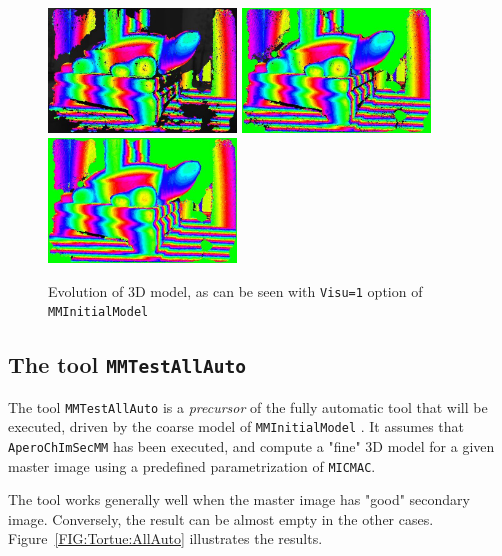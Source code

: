 \begin{figure}
\begin{center}
\includegraphics[width=50mm]{FIGS/Tortue/DumpMMTieP_6.jpg}
\includegraphics[width=50mm]{FIGS/Tortue/DumpMMTieP_7.jpg}
\includegraphics[width=50mm]{FIGS/Tortue/DumpMMTieP_8.jpg}
\end{center}
\caption{Evolution of 3D model, as can be seen with {\tt Visu=1} option
of {\tt MMInitialModel}}
\label{FIG:Tortue:Dump}
\end{figure}



\subsection{The tool {\tt MMTestAllAuto}}

The tool {\tt MMTestAllAuto} is a \emph{precursor} of the fully automatic tool that will
be executed, driven by the coarse model of {\tt MMInitialModel} . It assumes that  {\tt AperoChImSecMM}
has been executed, and compute a "fine" 3D model for a given master image using a predefined parametrization
of {\tt MICMAC}.

The tool works generally well when the master image has "good" secondary image. Conversely,
the  result can be almost empty in the other cases. Figure~\ref{FIG:Tortue:AllAuto} illustrates the
results.


